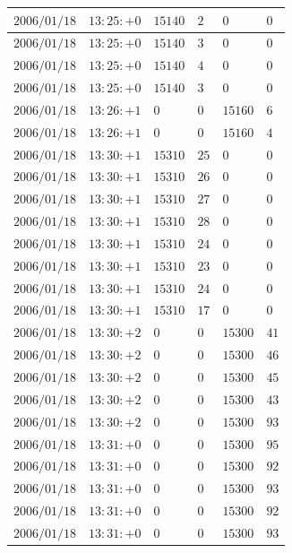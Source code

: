 \documentclass[a4j,papersize,disablejfam,slide,14pt]{jsarticle}
\begin{document}
\begin{description}
\begin{center}
\begin{longtable}{|l|l|l|l|l|l|}
					$2006/01/18$ & $13:25:+0$  & $15140$ & $2$ & $0$ & $0$ \\ \hline
					$2006/01/18$ & $13:25:+0$  & $15140$ & $3$ & $0$ & $0$ \\ \hline
					$2006/01/18$ & $13:25:+0$  & $15140$ & $4$ & $0$ & $0$ \\ \hline
					$2006/01/18$ & $13:25:+0$  & $15140$ & $3$ & $0$ & $0$ \\ \hline
					$2006/01/18$ & $13:26:+1$  & $0$ & $0$ & $15160$ & $6$ \\ \hline
					$2006/01/18$ & $13:26:+1$  & $0$ & $0$ & $15160$ & $4$ \\ \hline
					$2006/01/18$ & $13:30:+1$  & $15310$ & $25$ & $0$ & $0$ \\ \hline
					$2006/01/18$ & $13:30:+1$  & $15310$ & $26$ & $0$ & $0$ \\ \hline
					$2006/01/18$ & $13:30:+1$  & $15310$ & $27$ & $0$ & $0$ \\ \hline
					$2006/01/18$ & $13:30:+1$  & $15310$ & $28$ & $0$ & $0$ \\ \hline
					$2006/01/18$ & $13:30:+1$  & $15310$ & $24$ & $0$ & $0$ \\ \hline
					$2006/01/18$ & $13:30:+1$  & $15310$ & $23$ & $0$ & $0$ \\ \hline
					$2006/01/18$ & $13:30:+1$  & $15310$ & $24$ & $0$ & $0$ \\ \hline
					$2006/01/18$ & $13:30:+1$  & $15310$ & $17$ & $0$ & $0$ \\ \hline
					$2006/01/18$ & $13:30:+2$  & $0$ & $0$ & $15300$ & $41$ \\ \hline
					$2006/01/18$ & $13:30:+2$  & $0$ & $0$ & $15300$ & $46$ \\ \hline
					$2006/01/18$ & $13:30:+2$  & $0$ & $0$ & $15300$ & $45$ \\ \hline
					$2006/01/18$ & $13:30:+2$  & $0$ & $0$ & $15300$ & $43$ \\ \hline
					$2006/01/18$ & $13:30:+2$  & $0$ & $0$ & $15300$ & $93$ \\ \hline
					$2006/01/18$ & $13:31:+0$  & $0$ & $0$ & $15300$ & $95$ \\ \hline
					$2006/01/18$ & $13:31:+0$  & $0$ & $0$ & $15300$ & $92$ \\ \hline
					$2006/01/18$ & $13:31:+0$  & $0$ & $0$ & $15300$ & $93$ \\ \hline
					$2006/01/18$ & $13:31:+0$  & $0$ & $0$ & $15300$ & $92$ \\ \hline
					$2006/01/18$ & $13:31:+0$  & $0$ & $0$ & $15300$ & $93$ \\ \hline

\end{longtable}
\end{center}
\end{description}
\end{document}
